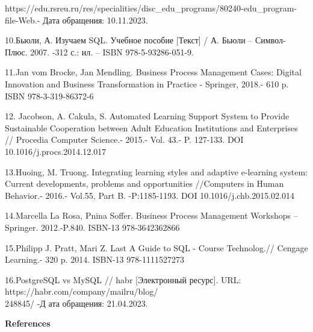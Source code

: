 \begin{noparindent}
https://edu.rsreu.ru/res/specialities/disc\_edu\_programs/80240-edu\_program-file-Web.-
Дата обращения: 10.11.2023.

10.Бьюли, А. Изучаем SQL. Учебное пособие {[}Текст{]} / А. Бьюли --
Символ-Плюс. 2007. -312 с.: ил. -- ISBN 978-5-93286-051-9.

11.Jan vom Brocke, Jan Mendling. Business Process Management Cases:
Digital Innovation and Business Transformation in Practice - Springer,
2018.- 610 p. ISBN 978-3-319-86372-6

12. Jacobson, A. Cakula, S. Automated Learning Support System to Provide
Sustainable Cooperation between Adult Education Institutions and
Enterprises // Procedia Computer Science.- 2015.- Vol. 43.- P. 127-133.
DOI 10.1016/j.procs.2014.12.017

13.Huoing, M. Truong. Integrating learning styles and adaptive
e-learning system: Current developments, problems and opportunities
//Computers in Human Behavior.- 2016.- Vol.55, Part B. -P:1185-1193. DOI
10.1016/j.chb.2015.02.014

14.Marcella La Rosa, Pnina Soffer. Business Process Management Workshops
-- Springer. 2012.-P.840. ISBN-13 978-3642362866

15.Philipp J. Pratt, Mari Z. Last A Guide to SQL - Course Technolog.//
Cengage Learning.- 320 p. 2014. ISBN-13 978-1111527273

16.PostgreSQL vs MySQL // habr {[}Электронный ресурс{]}. URL:
https://habr.com/company/mailru/blog/\\248845/ -Д ата обращения:
21.04.2023.

\end{noparindent}

\begin{center}
  {\bfseries References}
\end{center}

